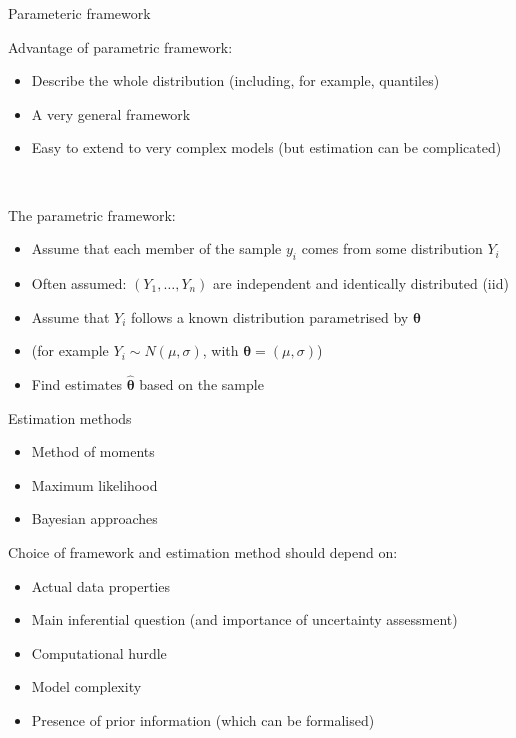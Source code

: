 \documentclass[
  10pt,
  ignorenonframetext,
  compress]{beamer}
\providecommand{\tightlist}{%
  \setlength{\itemsep}{0pt}\setlength{\parskip}{0pt}}
\begin{document}
\begin{frame}{Parameteric framework}
\protect\hypertarget{parameteric-framework}{}

\linespread{1.5}

Advantage of parametric framework:

\begin{itemize}
\tightlist
\item
  Describe the whole distribution (including, for example, quantiles)
\item
  A very general framework
\item
  Easy to extend to very complex models (but estimation can be
  complicated)
\end{itemize}

~

\pause

The parametric framework:

\begin{itemize}
\tightlist
\item
  Assume that each member of the sample \(y_i\) comes from some
  distribution \(Y_i\)
\item
  Often assumed: \((Y_1, \ldots, Y_n)\) are independent and identically
  distributed (iid)
\item
  Assume that \(Y_i\) follows a known distribution parametrised by
  \(\boldsymbol{\theta}\)
\item
  (for example \(Y_i \sim N(\mu, \sigma)\), with
  \(\boldsymbol{\theta} = (\mu, \sigma)\))
\item
  Find estimates \(\hat{\boldsymbol{\theta}}\) based on the sample
\end{itemize}

\end{frame}

\begin{frame}{Estimation methods}
\protect\hypertarget{estimation-methods}{}

\begin{itemize}
\tightlist
\item
  Method of moments
\item
  Maximum likelihood
\item
  Bayesian approaches
\end{itemize}

\pause

Choice of framework and estimation method should depend on:

\begin{itemize}
\tightlist
\item
  Actual data properties
\item
  Main inferential question (and importance of uncertainty assessment)
\item
  Computational hurdle
\item
  Model complexity
\item
  Presence of prior information (which can be formalised)
\end{itemize}

\end{frame}
\end{document}

